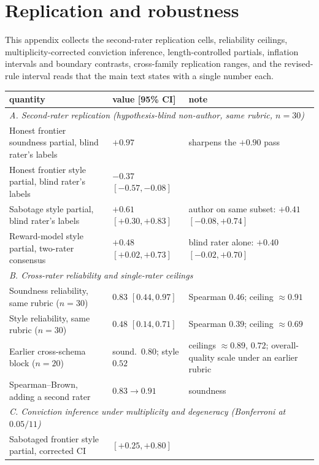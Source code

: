 \section{Replication and robustness}
\label{app:robust}
This appendix collects the second-rater replication cells, reliability ceilings, multiplicity-corrected conviction inference, length-controlled partials, inflation intervals and boundary contrasts, cross-family replication ranges, and the revised-rule interval reads that the main text states with a single number each.

\begin{table}[ht]
\centering
\scriptsize
\renewcommand{\arraystretch}{0.95}
\begin{tabular}{p{7.2cm}p{3.2cm}p{3.6cm}}
\toprule
quantity & value [95\% CI] & note \\
\midrule
\multicolumn{3}{l}{\emph{A. Second-rater replication (hypothesis-blind non-author, same rubric, $n{=}30$)}} \\
Honest frontier soundness partial, blind rater's labels & $+0.97$ & sharpens the $+0.90$ pass \\
Honest frontier style partial, blind rater's labels & $-0.37$ $[-0.57, -0.08]$ & \\
Sabotage style partial, blind rater's labels & $+0.61$ $[+0.30, +0.83]$ & author on same subset: $+0.41$ $[-0.08, +0.74]$ \\
Reward-model style partial, two-rater consensus & $+0.48$ $[+0.02, +0.73]$ & blind rater alone: $+0.40$ $[-0.02, +0.70]$ \\
\midrule
\multicolumn{3}{l}{\emph{B. Cross-rater reliability and single-rater ceilings}} \\
Soundness reliability, same rubric ($n{=}30$) & $0.83$ $[0.44, 0.97]$ & Spearman $0.46$; ceiling $\approx 0.91$ \\
Style reliability, same rubric ($n{=}30$) & $0.48$ $[0.14, 0.71]$ & Spearman $0.39$; ceiling $\approx 0.69$ \\
Earlier cross-schema block ($n{=}20$) & sound.\ $0.80$; style $0.52$ & ceilings $\approx 0.89$, $0.72$; overall-quality scale under an earlier rubric \\
Spearman--Brown, adding a second rater & $0.83 \to 0.91$ & soundness \\
\midrule
\multicolumn{3}{l}{\emph{C. Conviction inference under multiplicity and degeneracy (Bonferroni at $0.05/11$)}} \\
Sabotaged frontier style partial, corrected CI & $[+0.25, +0.80]$ & \\

\end{tabular}
\end{table}
